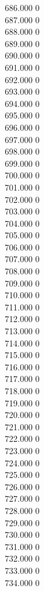 { 686.000	0 \\
 687.000	0 \\
 688.000	0 \\
 689.000	0 \\
 690.000	0 \\
 691.000	0 \\
 692.000	0 \\
 693.000	0 \\
 694.000	0 \\
 695.000	0 \\
 696.000	0 \\
 697.000	0 \\
 698.000	0 \\
 699.000	0 \\
 700.000	0 \\
 701.000	0 \\
 702.000	0 \\
 703.000	0 \\
 704.000	0 \\
 705.000	0 \\
 706.000	0 \\
 707.000	0 \\
 708.000	0 \\
 709.000	0 \\
 710.000	0 \\
 711.000	0 \\
 712.000	0 \\
 713.000	0 \\
 714.000	0 \\
 715.000	0 \\
 716.000	0 \\
 717.000	0 \\
 718.000	0 \\
 719.000	0 \\
 720.000	0 \\
 721.000	0 \\
 722.000	0 \\
 723.000	0 \\
 724.000	0 \\
 725.000	0 \\
 726.000	0 \\
 727.000	0 \\
 728.000	0 \\
 729.000	0 \\
 730.000	0 \\
 731.000	0 \\
 732.000	0 \\
 733.000	0 \\
 734.000	0 \\
}
